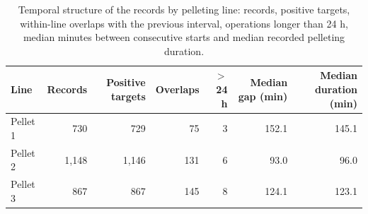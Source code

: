 \begin{table}[!htbp]\centering\small
\caption{Temporal structure of the records by pelleting line: records, positive targets, within-line overlaps with the previous interval, operations longer than 24 h, median minutes between consecutive starts and median recorded pelleting duration.}\label{tab:s_temporal}
\begin{tabular}{@{}lrrrrrr@{}}\toprule
Line & Records & Positive targets & Overlaps & $>$24 h & Median gap (min) & Median duration (min) \\\midrule
Pellet 1 & 730 & 729 & 75 & 3 & 152.1 & 145.1 \\
Pellet 2 & 1,148 & 1,146 & 131 & 6 & 93.0 & 96.0 \\
Pellet 3 & 867 & 867 & 145 & 8 & 124.1 & 123.1 \\
\bottomrule
\end{tabular}
\end{table}
